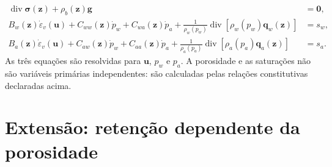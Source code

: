 \documentclass[11pt,a4paper]{article}
\newcommand{\Div}{\operatorname{div}}
\begin{document}
\begin{equation*}
\boxed{\begin{aligned}
\Div\boldsymbol\sigma(\mathbf z)+\rho_b(\mathbf z)\mathbf g&=\mathbf0,\\[2pt]
B_w(\mathbf z)\dot\varepsilon_v(\mathbf u)
+C_{ww}(\mathbf z)\dot p_w+C_{wa}(\mathbf z)\dot p_a
+\frac{1}{\rho_w(p_w)}\Div[\rho_w(p_w)\mathbf q_w(\mathbf z)]&=s_w,\\[2pt]
B_a(\mathbf z)\dot\varepsilon_v(\mathbf u)
+C_{aw}(\mathbf z)\dot p_w+C_{aa}(\mathbf z)\dot p_a
+\frac{1}{\rho_a(p_a)}\Div[\rho_a(p_a)\mathbf q_a(\mathbf z)]&=s_a.
\end{aligned}}
\end{equation*}
As tr\^es equa\c{c}\~oes s\~ao resolvidas para $\mathbf u$, $p_w$
e $p_a$. A porosidade e as satura\c{c}\~oes n\~ao s\~ao vari\'aveis
prim\'arias independentes: s\~ao calculadas pelas rela\c{c}\~oes
constitutivas declaradas acima.

\section{Extens\~ao: reten\c{c}\~ao dependente da porosidade}
\end{document}
